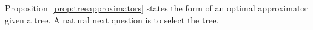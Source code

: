 Proposition~\ref{prop:treeapproximators} states the form of an optimal approximator given a tree.
A natural next question is to select the tree.



%
\strats

